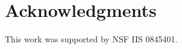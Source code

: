 \documentclass[preprint]{elsarticle}
\begin{document}
\section{Acknowledgments}
This work was supported by NSF IIS 0845401.



\begin{small}


\end{small}

\end{document}
